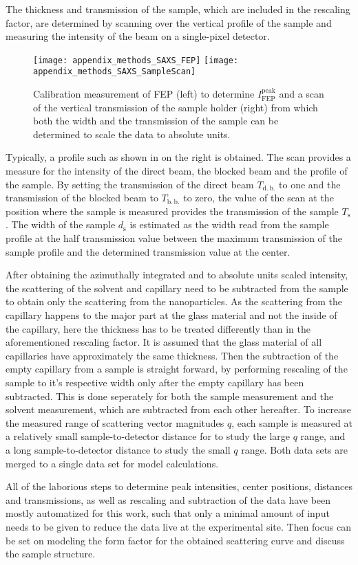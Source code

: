 \documentclass[\main/dresen_thesis.tex]{subfiles}
\begin{document}
    The thickness and transmission of the sample, which are included in the rescaling factor, are determined by scanning over the vertical profile of the sample and measuring the intensity of the beam on a single-pixel detector.
    \begin{figure}[tb]
      \centering
      \texttt{[image: appendix\_methods\_SAXS\_FEP]}
      \texttt{[image: appendix\_methods\_SAXS\_SampleScan]}
      \caption{\label{fig:methods:saxs:fep_scan}Calibration measurement of FEP (left) to determine $I_\mathrm{FEP}^\mathrm{peak}$ and a scan of the vertical transmission of the sample holder (right) from which both the width and the transmission of the sample can be determined to scale the data to absolute units.}
    \end{figure}
    Typically, a profile such as shown in  on the right is obtained.
    The scan provides a measure for the intensity of the direct beam, the blocked beam and the profile of the sample.
    By setting the transmission of the direct beam $T_\mathrm{d.\,b.}$ to one and the transmission of the blocked beam to $T_\mathrm{b.\,b.}$ to zero, the value of the scan at the position where the sample is measured provides the transmission of the sample $T_\mathrm{s}$.
    The width of the sample $d_\mathrm{s}$ is estimated as the width read from the sample profile at the half transmission value between the maximum transmission of the sample profile and the determined transmission value at the center.

    After obtaining the azimuthally integrated and to absolute units scaled intensity, the scattering of the solvent and capillary need to be subtracted from the sample to obtain only the scattering from the nanoparticles.
    As the scattering from the capillary happens to the major part at the glass material and not the inside of the capillary, here the thickness has to be treated differently than in the aforementioned rescaling factor.
    It is assumed that the glass material of all capillaries have approximately the same thickness.
    Then the subtraction of the empty capillary from a sample is straight forward, by performing rescaling of the sample to it's respective width only after the empty capillary has been subtracted.
    This is done seperately for both the sample measurement and the solvent measurement, which are subtracted from each other hereafter.
    To increase the measured range of scattering vector magnitudes $q$, each sample is measured at a relatively small sample-to-detector distance for to study the large $q$ range, and a long sample-to-detector distance to study the small $q$ range.
    Both data sets are merged to a single data set for model calculations.

    All of the laborious steps to determine peak intensities, center positions, distances and transmissions, as well as rescaling and subtraction of the data have been mostly automatized for this work, such that only a minimal amount of input needs to be given to reduce the data live at the experimental site.
    Then focus can be set on modeling the form factor for the obtained scattering curve and discuss the sample structure.
\end{document}
